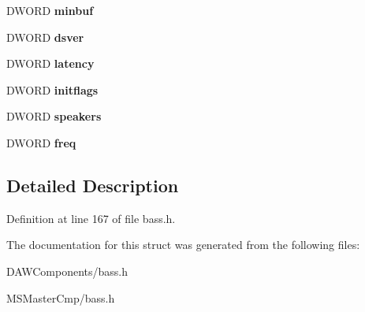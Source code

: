 \begin{DoxyCompactItemize}
\item 
\hypertarget{struct_b_a_s_s___i_n_f_o_a855c6df53310491802f018736e81dac4_a855c6df53310491802f018736e81dac4}{D\-W\-O\-R\-D {\bfseries minbuf}}\label{struct_b_a_s_s___i_n_f_o_a855c6df53310491802f018736e81dac4_a855c6df53310491802f018736e81dac4}

\item 
\hypertarget{struct_b_a_s_s___i_n_f_o_af8cabba039215c378dd6fd6ef0bf8e9f_af8cabba039215c378dd6fd6ef0bf8e9f}{D\-W\-O\-R\-D {\bfseries dsver}}\label{struct_b_a_s_s___i_n_f_o_af8cabba039215c378dd6fd6ef0bf8e9f_af8cabba039215c378dd6fd6ef0bf8e9f}

\item 
\hypertarget{struct_b_a_s_s___i_n_f_o_ab54c862f3f10d31df27541c83682c883_ab54c862f3f10d31df27541c83682c883}{D\-W\-O\-R\-D {\bfseries latency}}\label{struct_b_a_s_s___i_n_f_o_ab54c862f3f10d31df27541c83682c883_ab54c862f3f10d31df27541c83682c883}

\item 
\hypertarget{struct_b_a_s_s___i_n_f_o_a7c73adb1a84b1c7b2af2da81694e24da_a7c73adb1a84b1c7b2af2da81694e24da}{D\-W\-O\-R\-D {\bfseries initflags}}\label{struct_b_a_s_s___i_n_f_o_a7c73adb1a84b1c7b2af2da81694e24da_a7c73adb1a84b1c7b2af2da81694e24da}

\item 
\hypertarget{struct_b_a_s_s___i_n_f_o_a5b563d324e9551ab98ce9888c5277f72_a5b563d324e9551ab98ce9888c5277f72}{D\-W\-O\-R\-D {\bfseries speakers}}\label{struct_b_a_s_s___i_n_f_o_a5b563d324e9551ab98ce9888c5277f72_a5b563d324e9551ab98ce9888c5277f72}

\item 
\hypertarget{struct_b_a_s_s___i_n_f_o_a72d42df53abce9b0fd676aa220b377ad_a72d42df53abce9b0fd676aa220b377ad}{D\-W\-O\-R\-D {\bfseries freq}}\label{struct_b_a_s_s___i_n_f_o_a72d42df53abce9b0fd676aa220b377ad_a72d42df53abce9b0fd676aa220b377ad}

\end{DoxyCompactItemize}


\subsection{Detailed Description}


Definition at line 167 of file bass.\-h.



The documentation for this struct was generated from the following files\-:\begin{DoxyCompactItemize}
\item 
D\-A\-W\-Components/bass.\-h\item 
M\-S\-Master\-Cmp/bass.\-h\end{DoxyCompactItemize}
